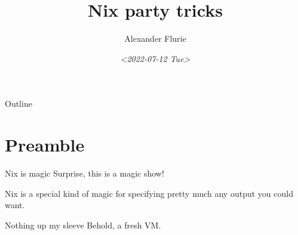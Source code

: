 \documentclass[bigger]{beamer}
\author{Alexander Flurie}
\date{\textit{<2022-07-12 Tue>}}
\title{Nix party tricks}
\begin{document}
\maketitle
\begin{frame}{Outline}
\tableofcontents
\end{frame}


\section{Preamble}
\label{sec:orgcf4ae11}
\begin{frame}[label={sec:orge93ee95}]{Nix is magic}
Surprise, this is a magic show!

Nix is a special kind of magic for specifying pretty much any output you could want.
\end{frame}
\begin{frame}[label={sec:orgb442b5b}]{Nothing up my sleeve}
Behold, a fresh VM.
\end{frame}
\end{document}
